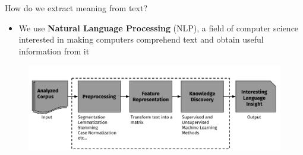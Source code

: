 \documentclass[10pt,=table]{beamer}
\begin{document}
\begin{frame}{How do we extract meaning from text?}

\begin{itemize}
\item[] {{We use \textbf{Natural Language Processing} (NLP), a field of computer science interested in making computers comprehend text and obtain useful information from it}}
\end{itemize}
\begin{figure}
\centering
\includegraphics[width=1\linewidth]{image2/Chapitre1/nlp_flow}
\end{figure}
\vspace{\textheight}
\end{frame}
\end{document}
